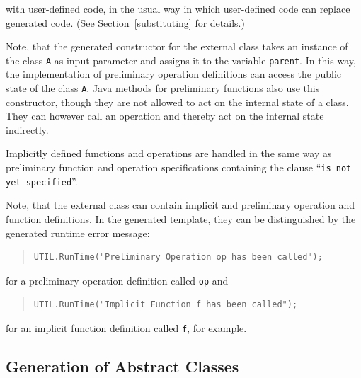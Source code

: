 \documentclass[\pformat,11pt]{article}
\begin{document}
with user-defined code, in the usual way in which user-defined code
can replace generated code. (See Section~\ref{substituting} for
details.)


Note, that the generated constructor for the external class takes an
instance of the class {\tt A} as input parameter and assigns it to the
variable {\tt parent}. In this way, the implementation of preliminary
operation definitions can access the public state of the class {\tt A}.
Java methods for preliminary functions also use this constructor,
though they are not allowed to act on the internal state of a
class. They can however call an operation and thereby act on the
internal state indirectly.  

Implicitly defined functions and operations are handled in the same way as 
preliminary function and operation specifications containing the
clause ``{\tt is not yet specified}''. 

Note, that the external class can contain implicit and preliminary
operation and function definitions. In the generated template, they
can be distinguished by the generated runtime error message: 

\begin{quote}
\begin{verbatim}
UTIL.RunTime("Preliminary Operation op has been called");
\end{verbatim}
\end{quote}

for a preliminary operation definition called {\tt op} and

\begin{quote}
\begin{verbatim}
UTIL.RunTime("Implicit Function f has been called");
\end{verbatim}
\end{quote}

for an implicit function definition called {\tt f}, for example.

\subsection{Generation of Abstract Classes}
\end{document}
